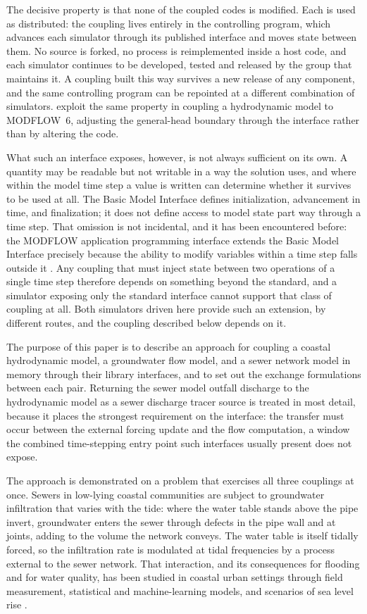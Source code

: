 \documentclass[preprint,authoryear,11pt]{elsarticle}
\begin{document}
The decisive property is that none of the coupled codes is modified. Each is used as distributed: the coupling lives entirely in the controlling program, which advances each simulator through its published interface and moves state between them. No source is forked, no process is reimplemented inside a host code, and each simulator continues to be developed, tested and released by the group that maintains it. A coupling built this way survives a new release of any component, and the same controlling program can be repointed at a different combination of simulators. \cite{jin2025gwocean} exploit the same property in coupling a hydrodynamic model to MODFLOW~6, adjusting the general-head boundary through the interface rather than by altering the code.

What such an interface exposes, however, is not always sufficient on its own. A quantity may be readable but not writable in a way the solution uses, and where within the model time step a value is written can determine whether it survives to be used at all. The Basic Model Interface defines initialization, advancement in time, and finalization; it does not define access to model state part way through a time step. That omission is not incidental, and it has been encountered before: the MODFLOW application programming interface extends the Basic Model Interface precisely because the ability to modify variables within a time step falls outside it \citep{hughes2022modflowapi}. Any coupling that must inject state between two operations of a single time step therefore depends on something beyond the standard, and a simulator exposing only the standard interface cannot support that class of coupling at all. Both simulators driven here provide such an extension, by different routes, and the coupling described below depends on it.

The purpose of this paper is to describe an approach for coupling a coastal hydrodynamic model, a groundwater flow model, and a sewer network model in memory through their library interfaces, and to set out the exchange formulations between each pair. Returning the sewer model outfall discharge to the hydrodynamic model as a sewer discharge tracer source is treated in most detail, because it places the strongest requirement on the interface: the transfer must occur between the external forcing update and the flow computation, a window the combined time-stepping entry point such interfaces usually present does not expose.

The approach is demonstrated on a problem that exercises all three couplings at once. Sewers in low-lying coastal communities are subject to groundwater infiltration that varies with the tide: where the water table stands above the pipe invert, groundwater enters the sewer through defects in the pipe wall and at joints, adding to the volume the network conveys. The water table is itself tidally forced, so the infiltration rate is modulated at tidal frequencies by a process external to the sewer network. That interaction, and its consequences for flooding and for water quality, has been studied in coastal urban settings through field measurement, statistical and machine-learning models, and scenarios of sea level rise \citep{liu2018gwsewer, su2019infiltration, liu2021predicting, su2022slr}.
\end{document}

